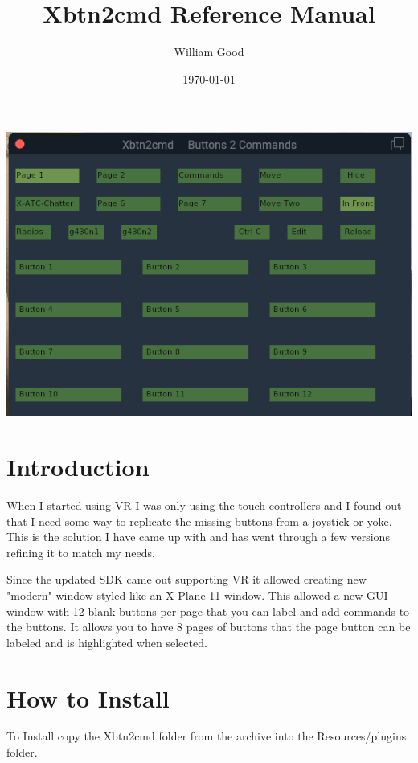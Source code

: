 \documentclass[11pt,parskip=half,a4paper]{scrartcl}
\begin{document}
\title{Xbtn2cmd Reference Manual}
\author{William Good}
\date{\today}

\maketitle
\vspace{2cm}

\begin{center}
\includegraphics[width=15cm]{Xbtn2cmd_Page1.png}
\end{center}

\thispagestyle{empty}
\newpage
\verb||
\tableofcontents

\newpage
\section{Introduction}

When I started using VR I was only using the touch controllers and I found out that I need some way to replicate the missing buttons from a joystick or yoke. This is the solution I have came up with and has went through a few versions refining it to match my needs. \newline

Since the updated SDK came out supporting VR it allowed creating new "modern" window styled like an X-Plane 11 window. This allowed a new GUI window with 12 blank buttons per page that you can label and add commands to the buttons. It allows you to have 8 pages of buttons that the page button can be labeled and is highlighted when selected. 

\section{How to Install}
To Install copy the Xbtn2cmd folder from the archive into the Resources/plugins folder. \newline
\end{document}
